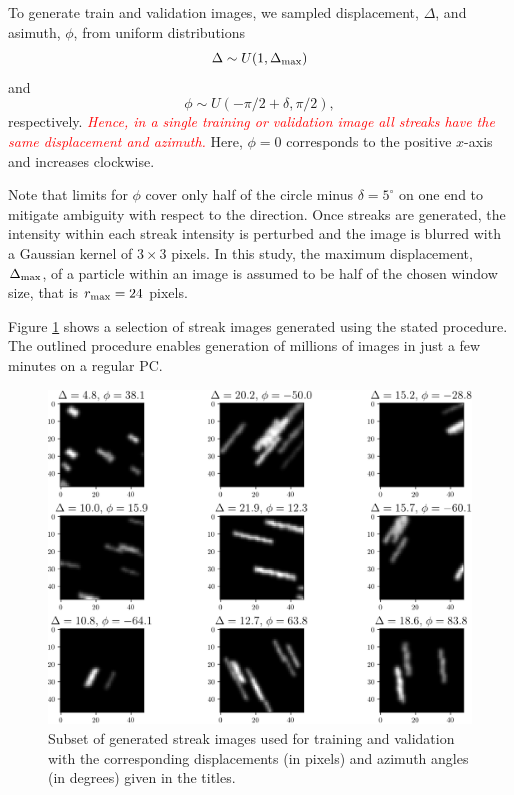 \documentclass{svjour3}                     %
\newcommand{\new}[1]{\textit{\textcolor{red}{#1}}}
\begin{document}
To generate train and validation images, we sampled displacement, $\Delta$, and asimuth, $\phi$, from uniform distributions
\begin{equation}
\Delta \sim U(1, \Delta_\textnormal{max}) 
\end{equation}
and
\begin{equation}
\phi \sim U(-\pi/2+\delta, \pi/2),
\end{equation}
respectively. \new{Hence, in a single training or validation image all streaks have the same displacement and azimuth.}
Here, $\phi = 0$ corresponds to the positive $x$-axis and increases clockwise. 

Note that limits for $\phi$ cover only half of the circle minus $\delta = 5^{\circ}$ on one end to mitigate ambiguity with respect to the direction. Once streaks are generated, the intensity within each streak intensity is perturbed and the image is blurred with a Gaussian kernel of $3\times 3$ pixels. In this study, the maximum displacement, $\Delta_\textnormal{max}$, of a particle within an image is assumed to be half of the chosen window size, that is $r_\textnormal{max} = 24$ pixels. 

Figure \ref{fig:fig1} shows a selection of streak images generated using the stated procedure. The outlined procedure enables generation of millions of images in just a few minutes on a regular PC. 

\begin{figure}
\includegraphics[width=\textwidth]{figs/figure1.png}
\caption{Subset of generated streak images used for training and validation with the corresponding displacements (in pixels) and azimuth angles (in degrees) given in the titles.}
\label{fig:fig1}
\end{figure}
\end{document}
